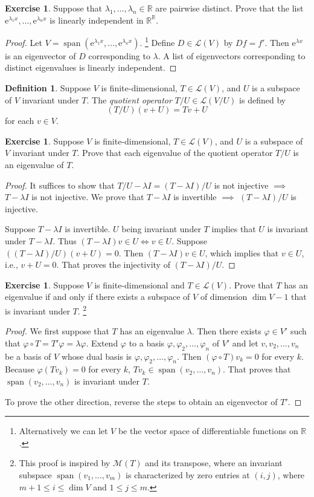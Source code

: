 \documentclass{tufte-handout}
\theoremstyle{plain} %
\theoremstyle{definition}
\newtheorem{defn}[thm]{Definition}
\newtheorem{exer}[thm]{Exercise}
\theoremstyle{remark}
\renewcommand{\phi}{\varphi}
\newcommand{\R}{\mathbb{R}}
\renewcommand{\L}{\mathcal{L}}
\newcommand{\M}{\mathcal{M}}
\newcommand{\e}{\mathrm{e}}
\DeclareMathOperator{\spn}{span}
\begin{document}
\begin{exer}
	Suppose that $\lambda_1,\dots,\lambda_n\in\R$ are pairwise distinct. Prove that the list $\e^{\lambda_1x},\dots,\e^{\lambda_nx}$ is linearly independent in $\R^\R$.
\end{exer}
\begin{proof}
	Let $V=\spn(\e^{\lambda_1x},\dots,\e^{\lambda_nx})$.%
	\footnote{Alternatively we can let $V$ be the vector space of differentiable functions on $\R$.}
	Define $D\in\L(V)$ by $Df=f'$. Then $\e^{\lambda x}$ is an eigenvector of $D$ corresponding to $\lambda$. A list of eigenvectors corresponding to distinct eigenvalues is linearly independent.
\end{proof}

\begin{defn}
	Suppose $V$ is finite-dimensional, $T\in\L(V)$, and $U$ is a subspace of $V$ invariant under $T$. The \emph{quotient operator} $T/U\in\L(V/U)$ is defined by
	\[(T/U)(v+U)=Tv+U\]
	for each $v\in V$.
\end{defn}

\begin{exer}
	Suppose $V$ is finite-dimensional, $T\in\L(V)$, and $U$ is a subspace of $V$ invariant under $T$. Prove that each eigenvalue of the quotient operator $T/U$ is an eigenvalue of $T$.
\end{exer}
\begin{proof}
	It suffices to show that $T/U-\lambda I=(T-\lambda I)/U$ is not injective $\implies$ $T-\lambda I$ is not injective. We prove that $T-\lambda I$ is invertible $\implies$ $(T-\lambda I)/U$ is injective.

	Suppose $T-\lambda I$ is invertible. $U$ being invariant under $T$ implies that $U$ is invariant under $T-\lambda I$. Thus $(T-\lambda I)v\in U\iff v\in U$. Suppose $((T-\lambda I)/U)(v+U)=0$. Then $(T-\lambda I)v\in U$, which implies that $v\in U$, i.e., $v+U=0$. That proves the injectivity of $(T-\lambda I)/U$.
\end{proof}

\begin{exer}
	Suppose $V$ is finite-dimensional and $T\in\L(V)$. Prove that $T$ has an eigenvalue if and only if there exists a subspace of $V$ of dimension $\dim V-1$ that is invariant under $T$.%
	\footnote{This proof is inspired by $\M(T)$ and its transpose, where an invariant subspace $\spn(v_1,\dots,v_m)$ is characterized by zero entries at $(i,j)$, where $m+1\leq i\leq\dim V$ and $1\leq j\leq m$.}
\end{exer}
\begin{proof}
	We first suppose that $T$ has an eigenvalue $\lambda$. Then there exists $\phi\in V'$ such that $\phi\circ T=T'\phi=\lambda\phi$. Extend $\phi$ to a basis $\phi,\phi_2,\dots,\phi_n$ of $V'$ and let $v,v_2,\dots,v_n$ be a basis of $V$ whose dual basis is $\phi,\phi_2,\dots,\phi_n$. Then $(\phi\circ T)v_k=0$ for every $k$. Because $\phi(T v_k)=0$ for every $k$, $Tv_k\in\spn(v_2,\dots,v_n)$. That proves that $\spn(v_2,\dots,v_n)$ is invariant under $T$.

	To prove the other direction, reverse the steps to obtain an eigenvector of $T'$.
\end{proof}
\end{document}
